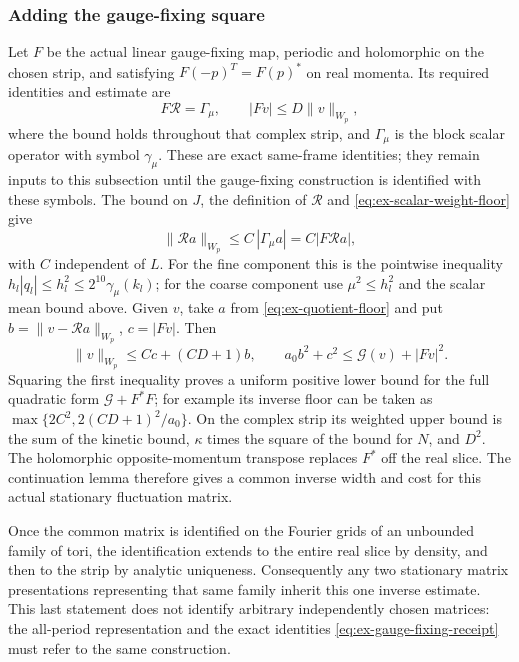 \subsubsection{Adding the gauge-fixing square}
Let $F$ be the actual linear gauge-fixing map, periodic and holomorphic
on the chosen strip, and satisfying $F(-p)^T=F(p)^*$ on real momenta.
Its required identities
and estimate are
\begin{equation}\label{eq:ex-gauge-fixing-receipt}
       F\mathcal R=\Gamma_\mu,
       \qquad |Fv|\leq D\|v\|_{W_p},
\end{equation}
where the bound holds throughout that complex strip, and $\Gamma_\mu$
is the block scalar operator with symbol $\gamma_\mu$. These are exact same-frame identities; they remain
inputs to this subsection until the gauge-fixing construction is
identified with these symbols.
The bound on $J$, the definition of $\mathcal R$ and
\eqref{eq:ex-scalar-weight-floor} give
\[
       \|\mathcal R a\|_{W_p}\leq C\,|\Gamma_\mu a|
                                 =C|F\mathcal R a|,
\]
with $C$ independent of $L$. For the fine component this is the
pointwise inequality $h_l|q_l|\leq h_l^2\leq2^{10}\gamma_\mu(k_l)$;
for the coarse component use $\mu^2\leq h_l^2$ and the scalar mean
bound above.
Given $v$, take $a$ from \eqref{eq:ex-quotient-floor} and put
$b=\|v-\mathcal R a\|_{W_p}$, $c=|Fv|$. Then
\[
       \|v\|_{W_p}\leq Cc+(CD+1)b,
       \qquad a_0b^2+c^2\leq\mathcal G(v)+|Fv|^2.
\]
Squaring the first inequality proves a uniform positive lower bound
for the full quadratic form $\mathcal G+F^*F$; for example its inverse
floor can be taken as
$\max\{2C^2,2(CD+1)^2/a_0\}$.
On the complex strip its weighted upper bound is the sum of the
kinetic bound, $\kappa$ times the square of the bound for $N$, and $D^2$.
The holomorphic opposite-momentum transpose replaces $F^*$ off the real
slice. The continuation lemma therefore gives a common inverse width
and cost for this actual stationary fluctuation matrix.

Once the common matrix is identified on the Fourier grids of an
unbounded family of tori, the identification extends to the entire
real slice by density, and then to the strip by analytic uniqueness.
Consequently any two stationary matrix presentations representing that
same family inherit this one inverse estimate. This last statement does
not identify arbitrary independently chosen matrices: the all-period
representation and the exact identities
\eqref{eq:ex-gauge-fixing-receipt} must refer to the same construction.

